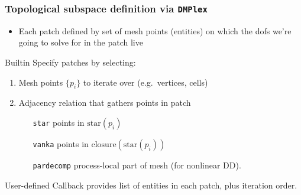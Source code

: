 \documentclass[presentation,aspectratio=43, 10pt]{beamer}
\begin{document}
\begin{frame}[fragile]
 \frametitle{Topological subspace definition via \texttt{DMPlex}}
 \begin{itemize}
 \item Each patch defined by set of mesh points (entities) on which the dofs
   we're going to solve for in the patch live
 \end{itemize}
 \begin{block}{Builtin}
   Specify patches by selecting:
   \begin{enumerate}
   \item Mesh points $\{p_i\}$ to iterate over (e.g.~vertices, cells)
   \item Adjacency relation that gathers points in patch
     \begin{itemize}
     \item[\texttt{star}] points in $\text{star}(p_i)$
     \item[\texttt{vanka}] points in
       $\text{closure}(\text{star}(p_i))$
     \item[\texttt{pardecomp}] process-local part of mesh (for
       nonlinear DD).
     \end{itemize}
   \end{enumerate}
 \end{block}
 \begin{block}{User-defined}
   Callback provides list of entities in each patch, plus iteration order.
 \end{block}
\end{frame}
\end{document}
